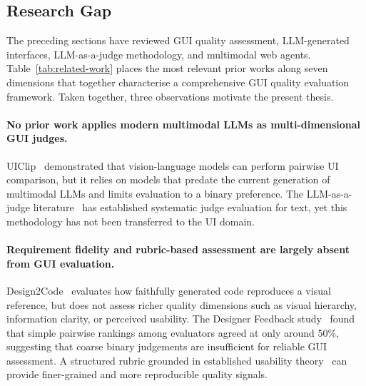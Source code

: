 %

\subsection{Research Gap}
\label{sec:gap}

The preceding sections have reviewed GUI quality assessment, LLM-generated
interfaces, LLM-as-a-judge methodology, and multimodal web agents.
Table~\ref{tab:related-work} places the most relevant prior works along
seven dimensions that together characterise a comprehensive GUI quality
evaluation framework.
Taken together, three observations motivate the present thesis.

\paragraph{No prior work applies modern multimodal LLMs as multi-dimensional GUI judges.}
UIClip~\cite{uiclip} demonstrated that vision-language models can perform
pairwise UI comparison, but it relies on models that predate the current
generation of multimodal LLMs and limits evaluation to a binary preference.
The LLM-as-a-judge literature~\cite{llm_judge,li-etal-2025-generation}
has established systematic judge evaluation for text, yet this methodology
has not been transferred to the UI domain.

\paragraph{Requirement fidelity and rubric-based assessment are largely absent from GUI evaluation.}
Design2Code~\cite{design2code} evaluates how faithfully generated code
reproduces a visual reference, but does not assess richer quality dimensions
such as visual hierarchy, information clarity, or perceived usability.
The Designer Feedback study~\cite{designer_feedback} found that simple
pairwise rankings among evaluators agreed at only around 50\%, suggesting
that coarse binary judgements are insufficient for reliable GUI assessment.
A structured rubric grounded in established usability
theory~\cite{nielsen1990heuristic,iso9241-11} can provide finer-grained and
more reproducible quality signals.

